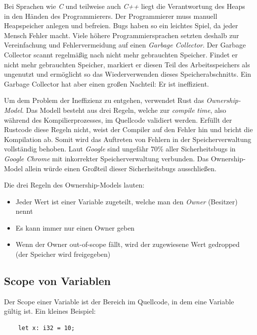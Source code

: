 Bei Sprachen wie \textit{C} und teilweise auch \textit{C++} liegt die Verantwortung des Heaps in den Händen des Programmierers. Der Programmierer
muss manuell Heapspeicher anlegen und befreien. Bugs haben so ein leichtes Spiel, da jeder Mensch Fehler macht. Viele höhere Programmiersprachen setzten
deshalb zur Vereinfachung und Fehlervermeidung auf einen \textit{Garbage Collector}. Der Garbage Collector scannt regelmäßig nach nicht mehr
gebrauchten Speicher. Findet er nicht mehr gebrauchten Speicher, markiert er diesen Teil des Arbeitsspeichers als ungenutzt und ermöglicht so 
das Wiederverwenden dieses Speicherabschnitts. Ein Garbage Collector hat aber einen großen Nachteil: Er ist ineffizient.

Um dem Problem der Ineffizienz zu entgehen, verwendet Rust das \textit{Ownership-Model}. Das Modell besteht
aus drei Regeln, welche zur \textit{compile time}, also während des Kompilierprozesses, im Quellcode validiert werden. Erfüllt der Rustcode diese Regeln nicht,
weist der Compiler auf den Fehler hin und bricht die Kompilation ab. Somit wird das Auftreten von Fehlern in der Speicherverwaltung
vollständig behoben. Laut \textit{Google} sind ungefähr 70\% aller Sicherheitsbugs in \textit{Google Chrome} mit inkorrekter Speicherverwaltung verbunden. \cite{googlechrome70}
Das Ownership-Model allein würde einen Großteil dieser Sicherheitsbugs ausschließen.

Die drei Regeln des Ownership-Models lauten:

\begin{itemize}
    \item Jeder Wert ist einer Variable zugeteilt, welche man den \textit{Owner} (Besitzer) nennt
    \item Es kann immer nur einen Owner geben
    \item Wenn der Owner out-of-scope fällt, wird der zugewiesene Wert gedropped (der Speicher wird freigegeben)
\end{itemize}
\cite{rustlangbookownership2}

\subsection{Scope von Variablen}
Der Scope einer Variable ist der Bereich im Quellcode, in dem eine Variable gültig ist. Ein kleines Beispiel:

\begin{lstlisting}
    let x: i32 = 10;
\end{lstlisting}

